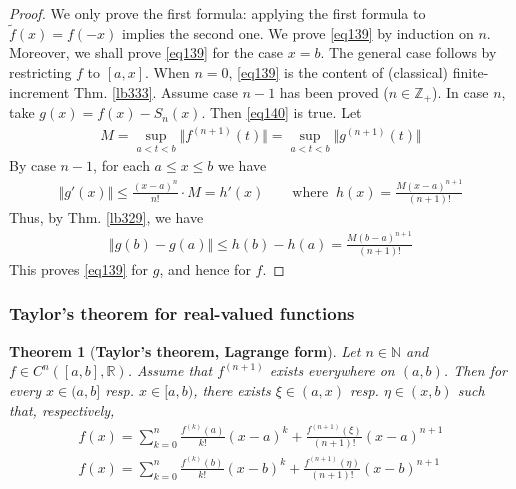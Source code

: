 \documentclass[12pt,b5paper,notitlepage]{article}
\theoremstyle{definition}
\theoremstyle{plain}
\newtheorem{thm}[df]{Theorem}
\newcommand{\wtd}{\widetilde}
\newcommand{\Nbb}{\mathbb N}
\newcommand{\Zbb}{\mathbb Z}
\newcommand{\Rbb}{\mathbb R}
\numberwithin{equation}{section}
\begin{document}
\begin{proof}
We only prove the first formula: applying the first formula to $\wtd f(x)=f(-x)$ implies the second one. We prove \eqref{eq139} by induction on $n$. Moreover, we shall prove \eqref{eq139} for the case $x=b$. The general case follows by restricting $f$ to $[a,x]$.  When $n=0$, \eqref{eq139} is the content of (classical) finite-increment Thm. \ref{lb333}. Assume case $n-1$ has been proved ($n\in\Zbb_+$). In case $n$, take $g(x)=f(x)-S_n(x)$. Then \eqref{eq140} is true. Let
\begin{align*}
M=\sup_{a<t<b}\Vert f^{(n+1)}(t)\Vert =\sup_{a<t<b}\Vert g^{(n+1)}(t)\Vert
\end{align*}
By case $n-1$, for each $a\leq x\leq b$ we have
\begin{align*}
\Vert g'(x)\Vert \leq\frac{(x-a)^n}{n!}\cdot M=h'(x)\qquad\text{where }~h(x)=\frac{M(x-a)^{n+1}}{(n+1)!} 
\end{align*}
Thus, by Thm. \ref{lb329}, we have
\begin{align*}
\Vert g(b)-g(a)\Vert\leq h(b)-h(a)=\frac{M(b-a)^{n+1}}{(n+1)!} 
\end{align*}
This proves \eqref{eq139} for $g$, and hence for $f$.
\end{proof}



\subsubsection{Taylor's theorem for real-valued functions}



\begin{thm}[\textbf{Taylor's theorem, Lagrange form}]\label{lb395}
Let $n\in\Nbb$ and $f\in C^n([a,b],\Rbb)$. Assume that $f^{(n+1)}$ exists everywhere on $(a,b)$. Then for every $x\in(a,b]$ resp. $x\in[a,b)$, there exists $\xi\in(a,x)$ resp. $\eta\in (x,b)$ such that, respectively,
\begin{subequations}
\begin{gather}
f(x)=\sum_{k=0}^n\frac{f^{(k)}(a)}{k!}(x-a)^k+\frac{f^{(n+1)}(\xi)}{(n+1)!}(x-a)^{n+1}\label{eq141}\\
f(x)=\sum_{k=0}^n\frac{f^{(k)}(b)}{k!}(x-b)^k+\frac{f^{(n+1)}(\eta)}{(n+1)!}(x-b)^{n+1}
\end{gather}
\end{subequations}
\end{thm}
\end{document}
